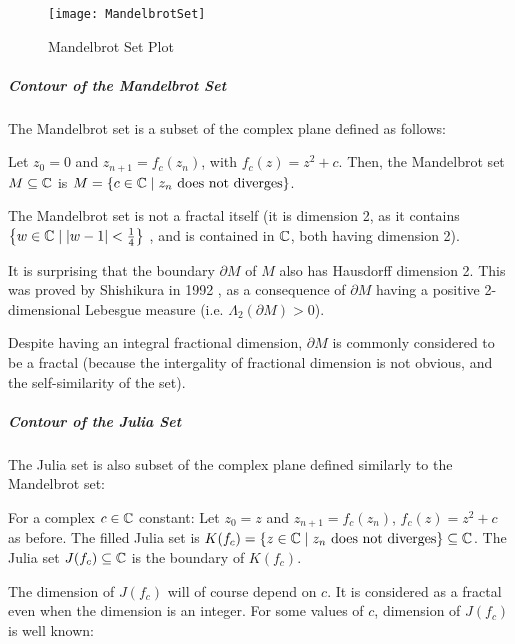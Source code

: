 \begin{wrapfigure}{r}{7.25cm}
	\centering
	\texttt{[image: MandelbrotSet]}
	\caption[Mandelbrot Set Plot]{Mandelbrot Set Plot\footnotemark}
	\label{fig:MandelbrotSet}
	\vspace{-0.75cm}
\end{wrapfigure}
\addtocounter{footnote}{-1}
\subparagraph{Contour of the Mandelbrot Set}
The Mandelbrot set is a subset of the complex plane defined as follows:
\begin{definition}\label{def:MandelbrotSet}
	Let $z_0 = 0$ and $z_{n+1} = f_c(z_n)$, with $f_c(z) = z^2+c$.
	Then, the Mandelbrot set $M \subseteq \mathbb{C}$ is $M = \left\lbrace c \in \mathbb{C} \mid z_n \text{ does not diverges} \right\rbrace$.
\end{definition}

The Mandelbrot set is not a fractal itself (it is dimension 2, as it contains $\left\lbrace w \in \mathbb{C} \mid | w-1 | < \frac{1}{4} \right\rbrace$ \cite{3DXplorMath}, and is contained in $\mathbb{C}$, both having dimension 2).

It is surprising that the boundary $\partial M$ of $M$ also has Hausdorff dimension 2.
This was proved by Shishikura in 1992 \cite{Shishikura_1992}, as a consequence of $\partial M$ having a positive 2-dimensional Lebesgue measure (i.e. $\Lambda_2(\partial M) > 0$).

Despite having an integral fractional dimension, $\partial M$ is commonly considered to be a fractal (because the intergality of fractional dimension is not obvious, and the self-similarity of the set).

\subparagraph{Contour of the Julia Set}
The Julia set is also subset of the complex plane defined similarly to the Mandelbrot set:
\begin{definition}\label{def:JuliaSet}
	For a complex $c \in \mathbb{C}$ constant:
	Let $z_0 = z$ and $z_{n+1} = f_c(z_n)$, $f_c(z) = z^2+c$ as before.
	The filled Julia set is $K(f_c) = \left\lbrace z \in \mathbb{C} \mid z_n \text{ does not diverges} \right\rbrace \subseteq \mathbb{C} $.
	The Julia set $J(f_c) \subseteq \mathbb{C}$ is the boundary of $K(f_c)$.
\end{definition}

The dimension of $J(f_c)$ will of course depend on $c$.
It is considered as a fractal even when the dimension is an integer.
For some values of $c$, dimension of $J(f_c)$ is well known:

